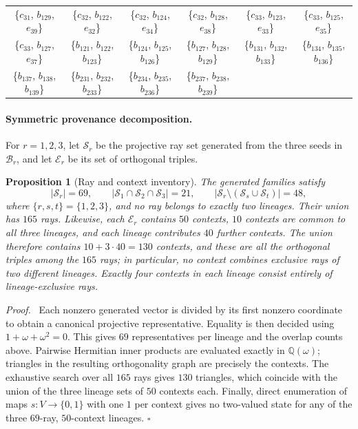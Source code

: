 \documentclass[%
  reprint,
  superscriptaddress,
  showkeys,
  amsmath,amssymb,
  aps,pra,
  longbibliography,
  floatfix,
  x11names
]{revtex4-2}
\newtheorem{proposition}{Proposition}
\newenvironment{proof}{\par\noindent\textit{Proof.}\ }{\hfill$\square$\par}
\begin{document}
\begin{table}[htbp!]
\begin{ruledtabular}
\begin{tabular}{*{6}{c}}
\{$c_{31}$, $b_{129}$, $e_{39}$\} & \{$c_{32}$, $b_{122}$, $e_{32}$\} & \{$c_{32}$, $b_{124}$, $e_{34}$\} & \{$c_{32}$, $b_{128}$, $e_{38}$\} & \{$c_{33}$, $b_{123}$, $e_{33}$\} & \{$c_{33}$, $b_{125}$, $e_{35}$\} \\
\{$c_{33}$, $b_{127}$, $e_{37}$\} & \{$b_{121}$, $b_{122}$, $b_{123}$\} & \{$b_{124}$, $b_{125}$, $b_{126}$\} & \{$b_{127}$, $b_{128}$, $b_{129}$\} & \{$b_{131}$, $b_{132}$, $b_{133}$\} & \{$b_{134}$, $b_{135}$, $b_{136}$\} \\
\{$b_{137}$, $b_{138}$, $b_{139}$\} & \{$b_{231}$, $b_{232}$, $b_{233}$\} & \{$b_{234}$, $b_{235}$, $b_{236}$\} & \{$b_{237}$, $b_{238}$, $b_{239}$\} & & \\
\end{tabular}
\end{ruledtabular}
\end{table}

\paragraph*{Symmetric provenance decomposition.}

For $r=1,2,3$, let $\mathcal{S}_r$ be the projective ray set generated from the three seeds in $\mathcal{B}_r$, and let $\mathcal{E}_r$ be its set of orthogonal triples.

\begin{proposition}[Ray and context inventory]
\label{prop:provenance}
The generated families satisfy
\[
|\mathcal{S}_r|=69,\qquad
|\mathcal{S}_1\cap\mathcal{S}_2\cap\mathcal{S}_3|=21,
\qquad |\mathcal{S}_r\setminus(\mathcal{S}_s\cup\mathcal{S}_t)|=48,
\]
where $\{r,s,t\}=\{1,2,3\}$, and no ray belongs to exactly two lineages.  Their union has $165$
rays.  Likewise, each $\mathcal{E}_r$ contains $50$ contexts, $10$ contexts are common to all three lineages, and each lineage contributes $40$ further contexts.  The union therefore contains $10+3\cdot40=130$ contexts, and these are all the orthogonal triples among the $165$ rays; in particular, no context combines exclusive rays of two different lineages.  Exactly four contexts in each lineage consist entirely of lineage-exclusive rays.
\end{proposition}

\begin{proof}
Each nonzero generated vector is divided by its first nonzero coordinate to obtain a canonical projective representative.  Equality is then decided using $1+\omega+\omega^2=0$.  This gives $69$ representatives per lineage and the overlap counts above.  Pairwise Hermitian inner products are evaluated exactly in $\mathbb{Q}(\omega)$; triangles in the resulting orthogonality graph are precisely the contexts.  The exhaustive search over all $165$ rays gives $130$ triangles, which coincide with the union of the three lineage sets of $50$ contexts each.  Finally, direct enumeration of maps $s:V\to\{0,1\}$ with one $1$ per context gives no two-valued state for any of the three $69$-ray, $50$-context lineages.
\end{proof}
\end{document}
